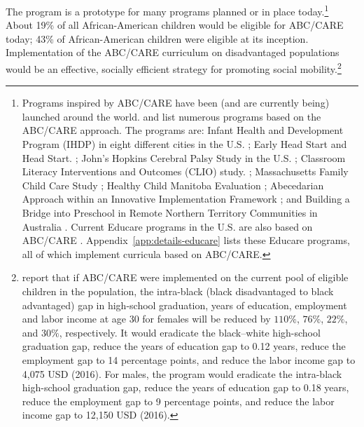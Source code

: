 The program is a prototype for many programs planned or in place today.\footnote{Programs inspired by ABC/CARE have been (and are currently being) launched around the world. \citet{Sparling_2010_Highlights} and \citet{Ramey_Ramey_Lanzi_2014_Interventions} list numerous programs based on the ABC/CARE approach. The programs are: Infant Health and Development Program (IHDP) in eight different cities in the U.S. \citep{Spiker-etal_1997_Helping}; Early Head Start and Head Start. \citep{Schneider_McDonald-eds_2007_Scale-Up_Vol-1}; John's Hopkins Cerebral Palsy Study in the U.S. \citep{Sparling_2010_Highlights}; Classroom Literacy Interventions and Outcomes (CLIO) study. \citep{Sparling_2010_Highlights}; Massachusetts Family Child Care Study \citep{Collins_etal_2010_Massachusetts-Study}; Healthy Child Manitoba Evaluation \citep{Healthy_Child_Manitoba_2015_Starting-Early}; Abecedarian Approach within an Innovative Implementation Framework \citep{Jensen_Nielsen_2016_ABC-Programme-Pilot}; and Building a Bridge into Preschool in Remote Northern Territory Communities in Australia \citep{UMonash_Dataset_2015_URL}. Current Educare programs in the U.S. are also based on ABC/CARE \citep{Educare_2014_Research_Agenda,Yazejian_Bryant_2012_Educare}. Appendix~\ref{app:details-educare} lists these Educare programs, all of which implement curricula based on ABC/CARE.} About 19\% of all African-American children would be eligible for ABC/CARE today; 43\% of African-American children were eligible at its inception. Implementation of the ABC/CARE curriculum on disadvantaged populations would be an effective, socially efficient strategy for promoting social mobility.\footnote{\citet{Garcia_2016_National-Implementation-ECI} report that if ABC/CARE were implemented on the current pool of eligible children in the population, the intra-black (black disadvantaged to black advantaged) gap in high-school graduation, years of education, employment and labor income at age 30 for females will be reduced by $110\%$, $76\%$, $22\%$, and $30\%$, respectively. It would eradicate the black--white high-school graduation gap, reduce the years of education gap to 0.12 years, reduce the employment gap to 14 percentage points, and reduce the labor income gap to 4,075 USD (2016). For males, the program would eradicate the intra-black high-school graduation gap, reduce the years of education gap to 0.18 years, reduce the employment gap to 9 percentage points, and reduce the labor income gap to 12,150 USD (2016).}

